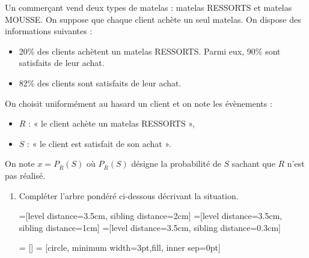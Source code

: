 \documentclass[11pt,fleqn, openany]{book} %
\begin{document}
\begin{exercise}[topic=prob13, subtitle={(Réunion 2023)}]
Un commerçant vend deux types de matelas : matelas RESSORTS et matelas MOUSSE. On suppose que chaque client achète un seul matelas. On dispose des informations suivantes :
\begin{itemize}
\item 20\% des clients achètent un matelas RESSORTS. Parmi eux, 90\% sont satisfaits de leur achat.
\item 82\% des clients sont satisfaits de leur achat.\end{itemize}

On choisit uniformément au hasard un client et on note les évènements :
\begin{itemize}
\item $R$ : « le client achète un matelas RESSORTS »,
\item $S$ : « le client est satisfait de son achat ».\end{itemize}
On note $x = P_{\overline{R}}(S)$ où $P_{\overline{R}}(S)$ désigne la probabilité de $S$ sachant que $R$ n'est pas réalisé.
\begin{enumerate}
\item Compléter l'arbre pondéré ci-dessous décrivant la situation.


=[level distance=3.5cm, sibling distance=2cm]
=[level distance=3.5cm, sibling distance=1cm]
=[level distance=3.5cm, sibling distance=0.3cm]

 = []
 = [circle, minimum width=3pt,fill, inner sep=0pt]


\begin{center}
\end{center}


\end{enumerate}
\end{exercise}
\end{document}
